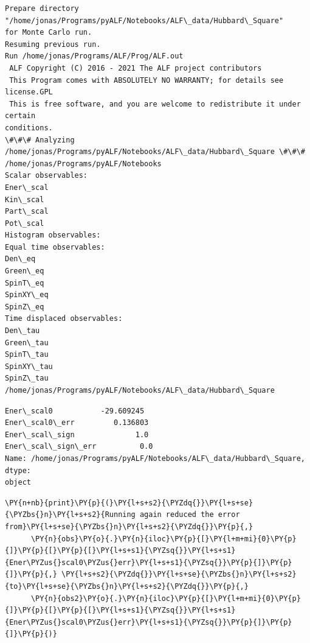     \begin{Verbatim}[commandchars=\\\{\}]
Prepare directory "/home/jonas/Programs/pyALF/Notebooks/ALF\_data/Hubbard\_Square"
for Monte Carlo run.
Resuming previous run.
Run /home/jonas/Programs/ALF/Prog/ALF.out
 ALF Copyright (C) 2016 - 2021 The ALF project contributors
 This Program comes with ABSOLUTELY NO WARRANTY; for details see license.GPL
 This is free software, and you are welcome to redistribute it under certain
conditions.
\#\#\# Analyzing /home/jonas/Programs/pyALF/Notebooks/ALF\_data/Hubbard\_Square \#\#\#
/home/jonas/Programs/pyALF/Notebooks
Scalar observables:
Ener\_scal
Kin\_scal
Part\_scal
Pot\_scal
Histogram observables:
Equal time observables:
Den\_eq
Green\_eq
SpinT\_eq
SpinXY\_eq
SpinZ\_eq
Time displaced observables:
Den\_tau
Green\_tau
SpinT\_tau
SpinXY\_tau
SpinZ\_tau
/home/jonas/Programs/pyALF/Notebooks/ALF\_data/Hubbard\_Square
    \end{Verbatim}

            \begin{tcolorbox}[breakable, size=fbox, boxrule=.5pt, pad at break*=1mm, opacityfill=0]
\begin{Verbatim}[commandchars=\\\{\}]
Ener\_scal0           -29.609245
Ener\_scal0\_err         0.136803
Ener\_scal\_sign              1.0
Ener\_scal\_sign\_err          0.0
Name: /home/jonas/Programs/pyALF/Notebooks/ALF\_data/Hubbard\_Square, dtype:
object
\end{Verbatim}
\end{tcolorbox}
        
    \begin{tcolorbox}[breakable, size=fbox, boxrule=1pt, pad at break*=1mm,colback=cellbackground, colframe=cellborder]
\begin{Verbatim}[commandchars=\\\{\}]
\PY{n+nb}{print}\PY{p}{(}\PY{l+s+s2}{\PYZdq{}}\PY{l+s+se}{\PYZbs{}n}\PY{l+s+s2}{Running again reduced the error from}\PY{l+s+se}{\PYZbs{}n}\PY{l+s+s2}{\PYZdq{}}\PY{p}{,}
      \PY{n}{obs}\PY{o}{.}\PY{n}{iloc}\PY{p}{[}\PY{l+m+mi}{0}\PY{p}{]}\PY{p}{[}\PY{p}{[}\PY{l+s+s1}{\PYZsq{}}\PY{l+s+s1}{Ener\PYZus{}scal0\PYZus{}err}\PY{l+s+s1}{\PYZsq{}}\PY{p}{]}\PY{p}{]}\PY{p}{,} \PY{l+s+s2}{\PYZdq{}}\PY{l+s+se}{\PYZbs{}n}\PY{l+s+s2}{to}\PY{l+s+se}{\PYZbs{}n}\PY{l+s+s2}{\PYZdq{}}\PY{p}{,}
      \PY{n}{obs2}\PY{o}{.}\PY{n}{iloc}\PY{p}{[}\PY{l+m+mi}{0}\PY{p}{]}\PY{p}{[}\PY{p}{[}\PY{l+s+s1}{\PYZsq{}}\PY{l+s+s1}{Ener\PYZus{}scal0\PYZus{}err}\PY{l+s+s1}{\PYZsq{}}\PY{p}{]}\PY{p}{]}\PY{p}{)}
\end{Verbatim}
\end{tcolorbox}

